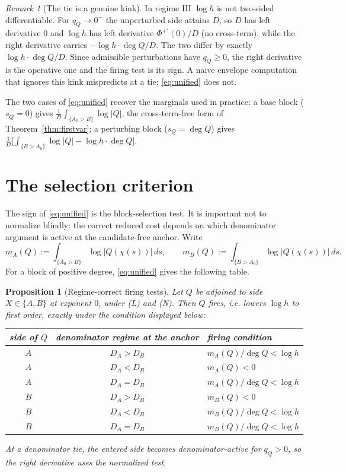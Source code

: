 \documentclass[11pt,reqno]{amsart}
\theoremstyle{plain}
\newtheorem{proposition}[theorem]{Proposition}
\theoremstyle{definition}
\theoremstyle{remark}
\newtheorem{remark}[theorem]{Remark}
\newcommand{\dA}{D_A}
\newcommand{\dB}{D_B}
\begin{document}
\begin{remark}[The tie is a genuine kink]\label{rem:kink}
In regime III $\log h$ is not two-sided differentiable. For $q_Q\to0^-$ the
unperturbed side attains $D$, so $D$ has left derivative $0$ and $\log h$ has left
derivative $\Phi^{+\prime}(0)/D$ (no cross-term), while the right derivative carries
$-\log h\cdot\deg Q/D$. The two differ by exactly $\log h\cdot\deg Q/D$. Since
admissible perturbations have $q_Q\ge0$, the right derivative is the operative one and
the firing test is its sign. A naive envelope computation that ignores this kink
mispredicts at a tie; \eqref{eq:unified} does not.
\end{remark}

The two cases of \eqref{eq:unified} recover the marginals used in practice: a base
block ($s_Q=0$) gives $\frac1D\int_{\{A_0>B\}}\log|Q|$, the cross-term-free form of
Theorem~\ref{thm:firstvar}; a perturbing block ($s_Q=\deg Q$) gives
$\frac1D\bigl[\int_{\{B>A_0\}}\log|Q|-\log h\cdot\deg Q\bigr]$.

\section{The selection criterion}\label{sec:criterion}

The sign of \eqref{eq:unified} is the block-selection test.  It is important not to
normalize blindly: the correct reduced cost depends on which denominator argument is
active at the candidate-free anchor.  Write
\[
  m_A(Q):=\int_{\{A_0>B\}}\log|Q(\chi(s))|\,ds,\qquad
  m_B(Q):=\int_{\{B>A_0\}}\log|Q(\chi(s))|\,ds .
\]
For a block of positive degree, \eqref{eq:unified} gives the following table.

\begin{proposition}[Regime-correct firing tests]\label{prop:regime-table}
Let $Q$ be adjoined to side $X\in\{A,B\}$ at exponent $0$, under \emph{(L)} and
\emph{(N)}.  Then $Q$ fires, i.e. lowers $\log h$ to first order, exactly under the
condition displayed below:
\begin{center}
\begin{tabular}{@{}ccl@{}}
\toprule
side of $Q$ & denominator regime at the anchor & firing condition\\
\midrule
$A$ & $\dA>\dB$ & $m_A(Q)/\deg Q<\log h$\\
$A$ & $\dA<\dB$ & $m_A(Q)<0$\\
$A$ & $\dA=\dB$ & $m_A(Q)/\deg Q<\log h$\\
$B$ & $\dA>\dB$ & $m_B(Q)<0$\\
$B$ & $\dA<\dB$ & $m_B(Q)/\deg Q<\log h$\\
$B$ & $\dA=\dB$ & $m_B(Q)/\deg Q<\log h$\\
\bottomrule
\end{tabular}
\end{center}
At a denominator tie, the entered side becomes denominator-active for $q_Q>0$, so the
right derivative uses the normalized test.
\end{proposition}
\end{document}
